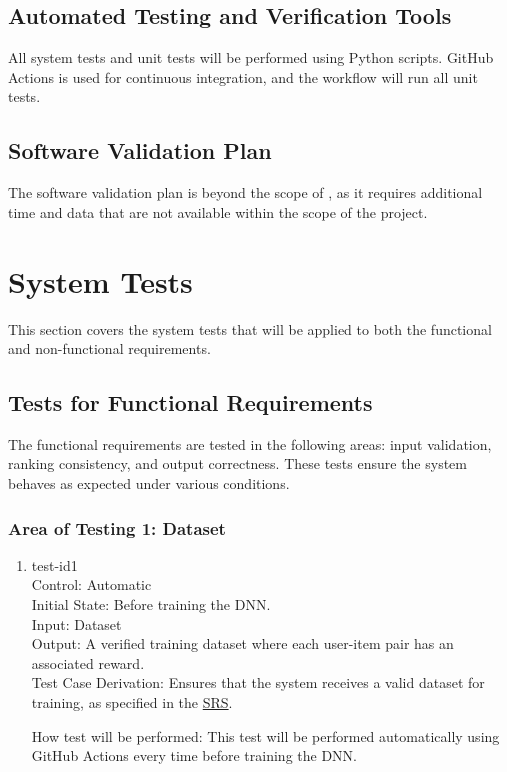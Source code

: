 \documentclass[12pt, titlepage]{article}
\begin{document}
\subsection{Automated Testing and Verification Tools}
All system tests and unit tests will be performed using Python scripts.  
GitHub Actions is used for continuous integration, and the workflow will run all unit tests.
\subsection{Software Validation Plan}

The software validation plan is beyond the scope of \progname, as it requires additional time and data that are not available within the scope of the project.

\section{System Tests}\label{SystemTest}

This section covers the system tests that will be applied to both the functional and non-functional requirements.

\subsection{Tests for Functional Requirements}

The functional requirements are tested in the following areas: input validation, ranking consistency, and output correctness. These tests ensure the system behaves as expected under various conditions.

\subsubsection{Area of Testing 1: Dataset}

\begin{enumerate}

  \item{test-id1\\}
  Control: Automatic\\
  Initial State: Before training the DNN.\\
  Input: Dataset\\
  Output: A verified training dataset where each user-item pair has an associated reward.\\
  Test Case Derivation: Ensures that the system receives a valid dataset for training, as specified in the \href{https://github.com/V-AS/Two-tower-recommender-system/blob/main/docs/SRS/SRS.pdf}{SRS}.

  How test will be performed: This test will be performed automatically using GitHub Actions every time before training the DNN.
					
\end{enumerate}
\end{document}
